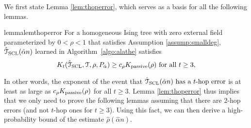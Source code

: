 \documentclass[11pt,onecolumn]{article}
\newcommand{\calT}{\mathcal{T}}
\newcommand{\hatcalT}{\hat{\calT}}
\newcommand{\halpha}{\hat{\alpha}}
\newcommand{\hrho}{\hat{\rho}}
\newcommand{\Passive}{{\rm passive}}
\begin{document}
We first state Lemma \ref{lem:thoperror}, which serves as a basis for all the following lemmas.
\begin{restatable}{lemma}{lemthoperror}
\label{lem:thoperror}
For a homogeneous Ising tree with zero external field parameterized by $0<\rho<1$ that satisfies Assumption \ref{assump:smalldeg}, $\hatcalT_{\rm{SCL}}(\halpha n)$ learned in Algorithm~\ref{algo:alathe} satisfies
\begin{align}
	K _{t}(\hatcalT_{{\rm SCL}},\calT,\rho,P_{\halpha})\geq c_{\rho}K _{\Passive}(\rho) \text{ for all }t\geq 3,
\end{align}
\end{restatable}
In other words, the exponent of the event that $\hatcalT_{\rm{SCL}}(\halpha n) \text{ has a }t\text{-hop error}$ is at least as large as $c_{\rho}K _{\Passive}(\rho)$ for all $t\geq 3$. Lemma \ref{lem:thoperror} thus implies 
that we only need to prove the following lemmas assuming that 
there are  $2$-hop errors (and not $t$-hop ones for $t\ge3$). 
Using this fact, we can then derive a high-probability bound of the estimate $\hrho(\halpha n)$.
\end{document}
